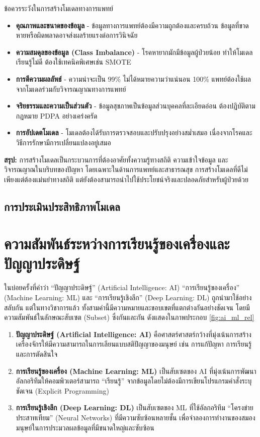 \begin{myLimit}[]{ข้อควรระวังในการสร้างโมเดลทางการแพทย์}{}
\begin{itemize}
	\item \textbf{คุณภาพและขนาดของข้อมูล} - ข้อมูลทางการแพทย์ต้องมีความถูกต้องและครบถ้วน ข้อมูลที่ขาดหายหรือผิดพลาดอาจส่งผลร้ายแรงต่อการวินิจฉัย
	\item \textbf{ความสมดุลของข้อมูล (Class Imbalance)} - โรคหายากมักมีข้อมูลผู้ป่วยน้อย ทำให้โมเดลเรียนรู้ไม่ดี ต้องใช้เทคนิคพิเศษเช่น SMOTE
	\item \textbf{การตีความผลลัพธ์} - ความน่าจะเป็น 99\% ไม่ได้หมายความว่าแน่นอน 100\% แพทย์ต้องใช้ผลจากโมเดลร่วมกับวิจารณญาณทางการแพทย์
	\item \textbf{จริยธรรมและความเป็นส่วนตัว} - ข้อมูลสุขภาพเป็นข้อมูลส่วนบุคคลที่ละเอียดอ่อน ต้องปฏิบัติตามกฎหมาย PDPA อย่างเคร่งครัด
	\item \textbf{การอัปเดตโมเดล} - โมเดลต้องได้รับการตรวจสอบและปรับปรุงอย่างสม่ำเสมอ เนื่องจากโรคและวิธีการรักษามีการเปลี่ยนแปลงอยู่เสมอ
\end{itemize}
\end{myLimit}

\textbf{สรุป:} การสร้างโมเดลเป็นกระบวนการที่ต้องอาศัยทั้งความรู้ทางสถิติ ความเข้าใจข้อมูล และวิจารณญาณในบริบทของปัญหา โดยเฉพาะในด้านการแพทย์และสาธารณสุข การสร้างโมเดลที่ดีไม่เพียงแต่ต้องแม่นยำทางสถิติ แต่ยังต้องสามารถนำไปใช้ประโยชน์จริงและปลอดภัยสำหรับผู้ป่วยด้วย

\subsection{การประเมินประสิทธิภาพโมเดล}

\section{ความสัมพันธ์ระหว่างการเรียนรู้ของเครื่องและปัญญาประดิษฐ์}
ในบ่อยครั้งที่คำว่า ``ปัญญาประดิษฐ์'' (Artificial Intelligence: AI) ``การเรียนรู้ของเครื่อง'' (Machine Learning: ML) และ ``การเรียนรู้เชิงลึก'' (Deep Learning: DL) ถูกนำมาใช้อย่างสลับกัน แต่ในทางวิชาการแล้ว ทั้งสามคำนี้มีความหมายและขอบเขตที่แตกต่างกันอย่างชัดเจน โดยมีความสัมพันธ์ในลักษณะสับเซต (Subset) ซึ่งกันและกัน ดังแสดงในภาพประกอบ \ref{fig:ai_ml_rel}

\begin{enumerate}
	\item \textbf{ปัญญาประดิษฐ์ (Artificial Intelligence: AI)} คือศาสตร์ศาสตร์กว้างที่มุ่งเน้นการสร้างเครื่องจักรให้มีความสามารถในการเลียนแบบสติปัญญาของมนุษย์ เช่น การแก้ปัญหา การเรียนรู้ และการตัดสินใจ
	\item \textbf{การเรียนรู้ของเครื่อง (Machine Learning: ML)} เป็นสับเซตของ AI ที่มุ่งเน้นการพัฒนาอัลกอริทึมให้คอมพิวเตอร์สามารถ ``เรียนรู้'' จากข้อมูลโดยไม่ต้องมีการเขียนโปรแกรมคำสั่งระบุชัดเจน (Explicit Programming)
	\item \textbf{การเรียนรู้เชิงลึก (Deep Learning: DL)} เป็นสับเซตของ ML ที่ใช้อัลกอริทึม ``โครงข่ายประสาทเทียม'' (Neural Networks) ที่มีความซับซ้อนหลายชั้น เพื่อจำลองการทำงานของสมองมนุษย์ในการประมวลผลข้อมูลที่มีขนาดใหญ่และซับซ้อน
\end{enumerate}

